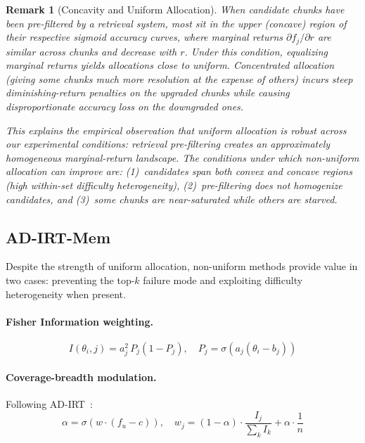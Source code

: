 \documentclass{article}
\newtheorem{remark}{Remark}
\begin{document}
\begin{remark}[Concavity and Uniform Allocation]
\label{rem:concavity}
When candidate chunks have been pre-filtered by a retrieval system, most sit in the upper (concave) region of their respective sigmoid accuracy curves, where marginal returns $\partial f_j / \partial r$ are similar across chunks and decrease with $r$. Under this condition, equalizing marginal returns yields allocations close to uniform. Concentrated allocation (giving some chunks much more resolution at the expense of others) incurs steep diminishing-return penalties on the upgraded chunks while causing disproportionate accuracy loss on the downgraded ones.

This explains the empirical observation that uniform allocation is robust across our experimental conditions: retrieval pre-filtering creates an approximately homogeneous marginal-return landscape. The conditions under which non-uniform allocation can improve are: (1)~candidates span both convex and concave regions (high within-set difficulty heterogeneity), (2)~pre-filtering does not homogenize candidates, and (3)~some chunks are near-saturated while others are starved.
\end{remark}

\subsection{AD-IRT-Mem}

Despite the strength of uniform allocation, non-uniform methods provide value in two cases: preventing the top-$k$ failure mode and exploiting difficulty heterogeneity when present.

\paragraph{Fisher Information weighting.}
\begin{equation}
I(\theta_i, j) = a_j^2 \, P_j(1 - P_j), \quad P_j = \sigma(a_j(\theta_i - b_j))
\end{equation}

\paragraph{Coverage-breadth modulation.} Following AD-IRT~\citep{kang2026adirt}:
\begin{equation}
\alpha = \sigma(w \cdot (f_u - c)), \quad w_j = (1 - \alpha) \cdot \frac{I_j}{\textstyle\sum_k I_k} + \alpha \cdot \frac{1}{n}
\end{equation}
\end{document}
